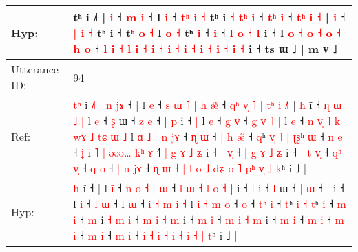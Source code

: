 \documentclass[10pt]{article}
\DeclareRobustCommand{\hl}[1]{{\textcolor{red}{#1}}}
\begin{document}
\begin{longtable}{ll}
 \\
Hyp: & tʰ i ˩˥ |\hl{}\hl{} \hl{i} ˧ \hl{}\hl{m} \hl{i} ˧\hl{}\hl{}\hl{} l \hl{i} ˧\hl{}\hl{}\hl{}\hl{}\hl{}\hl{}\hl{} \hl{}\hl{}\hl{t}\hl{ʰ} \hl{i} \hl{˧} tʰ i \hl{}\hl{˧} \hl{}\hl{t}\hl{ʰ} \hl{}\hl{i} ˧ \hl{t}\hl{ʰ} \hl{i} ˧ \hl{t}\hl{ʰ} \hl{i} \hl{˧} |\hl{}\hl{}\hl{}\hl{}\hl{}\hl{}\hl{}\hl{}\hl{}\hl{}\hl{}\hl{}\hl{}\hl{} \hl{i} ˧ \hl{|} \hl{i} \hl{˧} t\hl{}ʰ\hl{}\hl{}\hl{}\hl{}\hl{}\hl{}\hl{}\hl{} i ˧\hl{}\hl{}\hl{}\hl{}\hl{}\hl{}\hl{} t\hl{ʰ} \hl{o} \hl{˧} l\hl{}\hl{} \hl{o} \hl{˧} tʰ \hl{}\hl{i} ˧\hl{}\hl{} \hl{i} ˧\hl{}\hl{}\hl{}\hl{}\hl{}\hl{}\hl{}\hl{}\hl{} \hl{}\hl{l} \hl{}\hl{o} \hl{˧} \hl{l} i ˧ l \hl{o} \hl{˧} \hl{o} \hl{˧} \hl{o} \hl{˧} \hl{}\hl{h} \hl{}\hl{o} ˧ \hl{l} \hl{i} \hl{˧} \hl{l} \hl{}\hl{i} \hl{˧} \hl{i} \hl{˧} \hl{i} \hl{}\hl{˧} \hl{i} \hl{}\hl{˧} \hl{i} \hl{˧} \hl{i} \hl{˧} \hl{i} \hl{˧} i ˧ ts ɯ ˩ | m v̩ ˩
 \\
\midrule
Utterance ID: & 94 \\
Ref: & \hl{t}\hl{ʰ} i\hl{ }\hl{˩}\hl{˥}\hl{ }\hl{|}\hl{ }\hl{n}\hl{ }\hl{j}\hl{ɤ} ˧ | l \hl{}\hl{e} ˧ \hl{s} \hl{ɯ} \hl{˥} |\hl{ }\hl{h} \hl{æ}\hl{̃} ˧\hl{ }\hl{q}\hl{ʰ} \hl{v}\hl{̩} \hl{˥} \hl{|} \hl{t}\hl{ʰ} \hl{i} \hl{˩}\hl{˥} |\hl{ }\hl{h} i\hl{̃} ˧\hl{ }\hl{ɳ}\hl{ }\hl{ɯ}\hl{ }\hl{˩}\hl{ }\hl{|} l \hl{e} ˧ \hl{ʂ} ɯ ˧ \hl{z} \hl{e} ˧ |\hl{ }\hl{p} i ˧\hl{ }\hl{|} l \hl{e} ˧ \hl{g} \hl{v}\hl{̩} ˧\hl{ }\hl{g}\hl{ }\hl{v}\hl{̩}\hl{ }\hl{˥}\hl{ }\hl{|} l \hl{e} ˧\hl{ }\hl{n}\hl{ }\hl{v}\hl{̩}\hl{ }\hl{˥}\hl{ }\hl{k} \hl{w}\hl{ɤ} \hl{˩} \hl{t}\hl{ɕ} \hl{ɯ} \hl{˩} l\hl{ }\hl{ɑ} \hl{˩} \hl{|} \hl{n} \hl{j}\hl{ɤ} ˧\hl{ }\hl{ɳ} \hl{ɯ} ˧ \hl{|}\hl{ }\hl{h} \hl{æ}\hl{̃} ˧ \hl{q}ʰ\hl{ }\hl{v}\hl{̩} \hl{˥} \hl{|} \hl{ʈ}\hl{ʂ}ʰ \hl{ɯ} ˧ \hl{n} \hl{e} ˧ \hl{ʝ} i\hl{ }\hl{˥}\hl{ }\hl{|} \hl{ə}\hl{ə}\hl{ə}\hl{…} \hl{k}\hl{ʰ} \hl{ɤ} ˧\hl{˥}\hl{ }\hl{|} \hl{g} \hl{ɤ} \hl{˩} \hl{ʑ} i ˧ \hl{|} \hl{v}\hl{̩} ˧\hl{ }\hl{|} \hl{g} \hl{ɤ} \hl{˩} \hl{ʑ} i ˧\hl{ }\hl{|} \hl{t} \hl{v}\hl{̩} ˧ \hl{q}\hl{ʰ} \hl{v}\hl{̩} ˧ \hl{q} \hl{o} ˧\hl{ }\hl{|} \hl{n} \hl{j}\hl{ɤ} ˧ \hl{ɳ} \hl{ɯ} ˧\hl{ }\hl{|} \hl{l} \hl{o} \hl{˩} \hl{d}\hl{ʑ} \hl{o} \hl{˥} \hl{p}\hl{ʰ} \hl{v}\hl{̩} \hl{˩} \hl{k}ʰ i ˩ |
 \\
Hyp: & \hl{}\hl{h} i\hl{}\hl{}\hl{}\hl{}\hl{}\hl{}\hl{}\hl{}\hl{}\hl{̃} ˧ | l \hl{i}\hl{̃} ˧ \hl{n} \hl{o} \hl{˧} |\hl{}\hl{} \hl{}\hl{ɯ} ˧\hl{}\hl{}\hl{} \hl{}\hl{l} \hl{ɯ} \hl{˧} \hl{}\hl{l} \hl{o} \hl{}\hl{˧} |\hl{}\hl{} i\hl{} ˧\hl{}\hl{}\hl{}\hl{}\hl{}\hl{}\hl{}\hl{} l \hl{i} ˧ \hl{l} ɯ ˧ \hl{|} \hl{ɯ} ˧ |\hl{}\hl{} i ˧\hl{}\hl{} l \hl{i} ˧ \hl{l} \hl{}\hl{ɯ} ˧\hl{}\hl{}\hl{}\hl{}\hl{}\hl{}\hl{}\hl{}\hl{} l \hl{ɯ} ˧\hl{}\hl{}\hl{}\hl{}\hl{}\hl{}\hl{}\hl{}\hl{} \hl{}\hl{i} \hl{˧} \hl{}\hl{m} \hl{i} \hl{˧} l\hl{}\hl{} \hl{i} \hl{˧} \hl{m} \hl{}\hl{o} ˧\hl{}\hl{} \hl{o} ˧ \hl{}\hl{t}\hl{ʰ} \hl{}\hl{i} ˧ \hl{t}ʰ\hl{}\hl{}\hl{} \hl{i} \hl{˧} \hl{}\hl{t}ʰ \hl{i} ˧ \hl{m} \hl{i} ˧ \hl{m} i\hl{}\hl{}\hl{}\hl{} \hl{}\hl{}\hl{}\hl{˧} \hl{}\hl{m} \hl{i} ˧\hl{}\hl{}\hl{} \hl{m} \hl{i} \hl{˧} \hl{m} i ˧ \hl{m} \hl{}\hl{i} ˧\hl{}\hl{} \hl{m} \hl{i} \hl{˧} \hl{m} i ˧\hl{}\hl{} \hl{m} \hl{}\hl{i} ˧ \hl{}\hl{m} \hl{}\hl{i} ˧ \hl{m} \hl{i} ˧\hl{}\hl{} \hl{m} \hl{}\hl{i} ˧ \hl{m} \hl{i} ˧\hl{}\hl{} \hl{i} \hl{˧} \hl{i} \hl{}\hl{˧} \hl{i} \hl{˧} \hl{}\hl{i} \hl{}\hl{˧} \hl{|} \hl{t}ʰ i ˩ |

\end{longtable}
\end{document}
